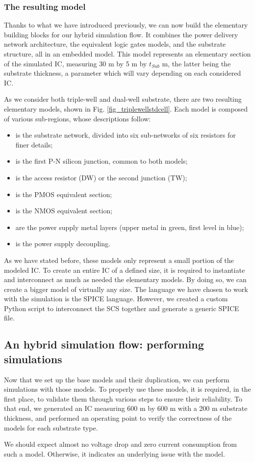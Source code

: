 	\subsubsection{The resulting model}
		Thanks to what we have introduced previously, we can now build the elementary building blocks for our hybrid simulation flow.
		It combines the power delivery network architecture, the equivalent logic gates models, and the substrate structure, all in an embedded model.
		This model represents an elementary section of the simulated IC, measuring 30 \textmu m by 5 \textmu m by $t_{Sub}$ \textmu m, the latter being the substrate thickness, a parameter which will vary depending on each considered IC.
		
		As we consider both triple-well and dual-well substrate, there are two resulting elementary models, shown in Fig. \ref{fig_triplewellstdcell}.
		Each model is composed of various sub-regions, whose descriptions follow:
		\begin{itemize}
			\item {} is the substrate network, divided into six sub-networks of six resistors for finer details;
			\item {} is the first P-N silicon junction, common to both models;
			\item {} is the access resistor (DW) or the second junction (TW);
			\item {} is the PMOS equivalent section;
			\item {} is the NMOS equivalent section;
			\item {} are the power supply metal layers (upper metal in green, first level in blue);
			\item {} is the power supply decoupling.
		\end{itemize}
		As we have stated before, these models only represent a small portion of the modeled IC.
		To create an entire IC of a defined size, it is required to instantiate and interconnect as much as needed the elementary models.
		By doing so, we can create a bigger model of virtually any size.
		The language we have chosen to work with the simulation is the SPICE language.
		However, we created a custom Python script to interconnect the SCS together and generate a generic SPICE file.

\subsection{An hybrid simulation flow: performing simulations}
	Now that we set up the base models and their duplication, we can perform simulations with those models.
	To properly use these models, it is required, in the first place, to validate them through various steps to ensure their reliability.
	To that end, we generated an IC measuring 600 \textmu m by 600 \textmu m with a 200 \textmu m substrate thickness, and performed an operating point to verify the correctness of the models for each substrate type.
	
	We should expect almost no voltage drop and zero current consumption from such a model.
	Otherwise, it indicates an underlying issue with the model.


